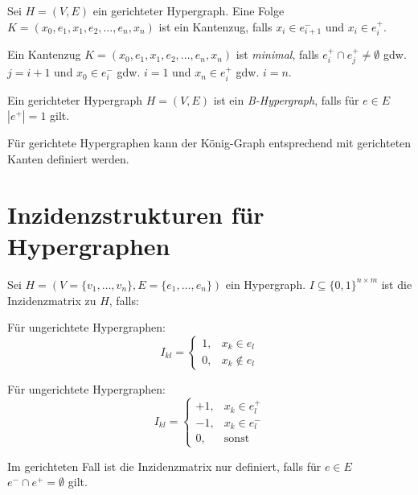 \begin{definition}[Kantenzug]
    Sei $ H = (V, E) $ ein gerichteter Hypergraph.
    Eine Folge $ K = (x_0, e_1, x_1, e_2, \dots, e_n, x_n) $ ist ein Kantenzug, falls $ x_i \in e_{i + 1}^- $ und $ x_i \in e_i^+ $.
\end{definition}

\begin{definition}
    Ein Kantenzug $ K = (x_0, e_1, x_1, e_2, \dots, e_n, x_n) $ ist \textit{minimal}, falls $ e_i^+ \cap e_j^+ \ne \emptyset $ gdw. $ j = i + 1 $ und $ x_0 \in e_i^- $ gdw. $ i = 1 $ und $ x_n \in e_i^+ $ gdw. $ i = n $.
\end{definition}

\begin{definition}[B-Hypergraph]
    Ein gerichteter Hypergraph $ H = (V, E) $ ist ein \textit{B-Hypergraph}, falls für $ e \in E $ $ |e^+| = 1 $ gilt.
\end{definition}

\begin{remark}
    Für gerichtete Hypergraphen kann der König-Graph entsprechend mit gerichteten Kanten definiert werden.
\end{remark}

\section{Inzidenzstrukturen für Hypergraphen}

\begin{definition}[Inzidenzmatrix]
    Sei $ H = (V = \{ v_1, \dots, v_n \}, E = \{ e_1, \dots, e_n \}) $ ein Hypergraph.
    $ I \subseteq \{ 0, 1 \}^{n \times m} $ ist die Inzidenzmatrix zu $ H $, falls:
    \begin{multicols}{2}
        Für ungerichtete Hypergraphen:
        \begin{equation*}
            I_{kl} = \begin{cases}
                1, & x_k \in e_l \\
                0, & x_k \notin e_l
            \end{cases}
        \end{equation*}
        \columnbreak

        Für ungerichtete Hypergraphen:
        \begin{equation*}
            I_{kl} = \begin{cases}
                +1, & x_k \in e_l^+ \\
                -1, & x_k \in e_l^- \\
                0, & \text{sonst}
            \end{cases}
        \end{equation*}

        Im gerichteten Fall ist die Inzidenzmatrix nur definiert, falls für $ e \in E $ $ e^- \cap e^+ = \emptyset $ gilt.
    \end{multicols}
\end{definition}

